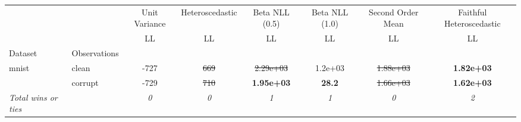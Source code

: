 \begin{tabular}{ll|c|c|c|c|c|c}
\toprule
{} & {} & {Unit Variance} & {Heteroscedastic} & {Beta NLL (0.5)} & {Beta NLL (1.0)} & {Second Order Mean} & {Faithful Heteroscedastic} \\
{} & {} & {LL} & {LL} & {LL} & {LL} & {LL} & {LL} \\
{Dataset} & {Observations} & {} & {} & {} & {} & {} & {} \\
\midrule
\multirow[t]{2}{*}{mnist} & clean & -727 & \sout{669} & \sout{2.29e+03} & 1.2e+03 & \sout{1.88e+03} & \textbf{1.82e+03} \\
 & corrupt & -729 & \sout{710} & \textbf{1.95e+03} & \textbf{28.2} & \sout{1.66e+03} & \textbf{1.62e+03} \\
\textit{{Total wins or ties}} &  & \textit{0} & \textit{0} & \textit{1} & \textit{1} & \textit{0} & \textit{2} \\
\bottomrule
\end{tabular}
